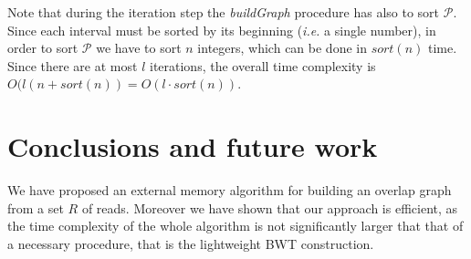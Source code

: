 \documentclass[runningheads,envcountsame,a4paper]{llncs}
\newcommand{\ie}{\textit{i.e.}\xspace}
\begin{document}
Note that during the iteration step the \emph{buildGraph} procedure has also to
sort $\mathcal{P}$. Since each interval must be sorted by its beginning (\ie a
single number), in order to sort  $\mathcal{P}$ we have to sort $n$ integers,
which can be done in $sort(n)$ time.
%
Since there are at most $l$ iterations, the overall time complexity is
$O(l (n + sort(n))=O(l \cdot sort(n))$.



\section{Conclusions and future work}
%

We have  proposed an external memory algorithm for building an overlap  graph from a set $R$ of reads.
Moreover we have shown that our approach is efficient, as the time complexity of
the whole algorithm is not significantly larger that that of a necessary
procedure, that is the lightweight BWT construction.
\end{document}
